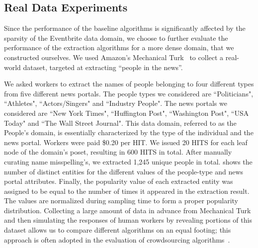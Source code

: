 \subsection{Real Data Experiments}
\label{sec:realdata}
Since the performance of the baseline algorithms is significantly affected by the sparsity of the Eventbrite data domain, we choose to further evaluate the performance of the extraction algorithms for a more dense domain, that we constructed ourselves. We used Amazon's Mechanical Turk~\cite{mturk} to collect a real-world dataset, targeted at extracting ``people in the news''. 

We asked workers to extract the names of people belonging to four different types from five different news portals. The people types we considered are ``Politicians", ``Athletes", ``Actors/Singers" and ``Industry People". The news portals we considered are ``New York Times", ``Huffington Post", ``Washington Post", ``USA  Today" and ``The Wall Street Journal". This data domain, referred to as the People's domain, is essentially characterized by the type of the individual and the news portal. Workers were paid \$0.20 per HIT. We issued 20 HITS for each leaf node of the domain's poset, resulting in 600 HITS in total. After manually curating name misspelling's, we extracted 1,245 unique people in total.  shows the number of distinct entities for the different values of the people-type and news portal attributes. Finally, the popularity value of each extracted entity was assigned to be equal to the number of times it appeared in the extraction result. The values are normalized during sampling time to form a proper popularity distribution. Collecting a large amount of data in advance from Mechanical Turk and then simulating the responses of human workers by revealing portions of this dataset allows us to compare different algorithms on an equal footing; this approach is often adopted in the evaluation of crowdsourcing algorithms~\cite{DBLP:journals/pvldb/ParameswaranBG0PW14, marcus:2011,trushkowsky:2013}.

